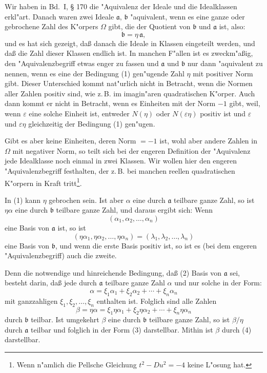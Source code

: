 \documentclass[12pt,a4paper]{article}
\theoremstyle{plain}
\begin{document}
Wir haben in Bd.~I, \S{} 170 die "Aquivalenz der Ideale und die Idealklassen erkl"art. Danach waren zwei Ideale $\mathfrak{a}$, $\mathfrak{b}$ "aquivalent, wenn es eine ganze oder gebrochene Zahl des K"orpers $\Omega$ gibt, die der Quotient von $\mathfrak{b}$ und $\mathfrak{a}$ ist, also:
\begin{equation}
\mathfrak{b} = \eta\,\mathfrak{a},
\tag{1}
\end{equation}
und es hat sich gezeigt, da\ss{} danach die Ideale in Klassen eingeteilt werden, und da\ss{} die Zahl dieser Klassen endlich ist. In manchen F"allen ist es zweckm"a\ss ig, den "Aquivalenzbegriff etwas enger zu fassen und $\mathfrak{a}$ und $\mathfrak{b}$ nur dann "aquivalent zu nennen, wenn es eine der Bedingung (1) gen"ugende Zahl $\eta$ mit positiver Norm gibt. Dieser Unterschied kommt nat"urlich nicht in Betracht, wenn die Normen aller Zahlen positiv sind, wie z.\,B. im imagin"aren quadratischen K"orper. Auch dann kommt er nicht in Betracht, wenn es Einheiten mit der Norm $-1$ gibt, weil, wenn $\varepsilon$ eine solche Einheit ist, entweder $N(\eta)$ oder $N(\varepsilon\eta)$ positiv ist und $\varepsilon$ und $\varepsilon\eta$ gleichzeitig der Bedingung (1) gen"ugen.

Gibt es aber keine Einheiten, deren Norm $=-1$ ist, wohl aber andere Zahlen in $\Omega$ mit negativer Norm, so teilt sich bei der engeren Definition der "Aquivalenz jede Idealklasse noch einmal in zwei Klassen. Wir wollen hier den engeren "Aquivalenzbegriff festhalten, der z.\,B. bei manchen reellen quadratischen K"orpern in Kraft tritt\footnote{Wenn n"amlich die Pellsche Gleichung $t^2 - Du^2 = -4$ keine L"osung hat.}.

In (1) kann $\eta$ gebrochen sein. Ist aber $\alpha$ eine durch $\mathfrak{a}$ teilbare ganze Zahl, so ist $\eta\alpha$ eine durch $\mathfrak{b}$ teilbare ganze Zahl, und daraus ergibt sich: Wenn
\begin{equation}
(\alpha_1, \alpha_2, \ldots, \alpha_n)
\tag{2}
\end{equation}
eine Basis von $\mathfrak{a}$ ist, so ist
\[
(\eta\alpha_1, \eta\alpha_2, \ldots, \eta\alpha_n) = (\lambda_1, \lambda_2, \ldots, \lambda_n)
\]
eine Basis von $\mathfrak{b}$, und wenn die erste Basis positiv ist, so ist es (bei dem engeren "Aquivalenzbegriff) auch die zweite.

Denn die notwendige und hinreichende Bedingung, da\ss{} (2) Basis von $\mathfrak{a}$ sei, besteht darin, da\ss{} jede durch $\mathfrak{a}$ teilbare ganze Zahl $\alpha$ und nur solche in der Form:
\begin{equation}
\alpha = \xi_1\alpha_1 + \xi_2\alpha_2 + \cdots + \xi_n\alpha_n
\tag{3}
\end{equation}
mit ganzzahligen $\xi_1, \xi_2, \ldots, \xi_n$ enthalten ist. Folglich sind alle Zahlen
\begin{equation}
\beta = \eta\alpha = \xi_1\eta\alpha_1 + \xi_2\eta\alpha_2 + \cdots + \xi_n\eta\alpha_n
\tag{4}
\end{equation}
durch $\mathfrak{b}$ teilbar. Ist umgekehrt $\beta$ eine durch $\mathfrak{b}$ teilbare ganze Zahl, so ist $\beta/\eta$ durch $\mathfrak{a}$ teilbar und folglich in der Form (3) darstellbar. Mithin ist $\beta$ durch (4) darstellbar.
\end{document}
